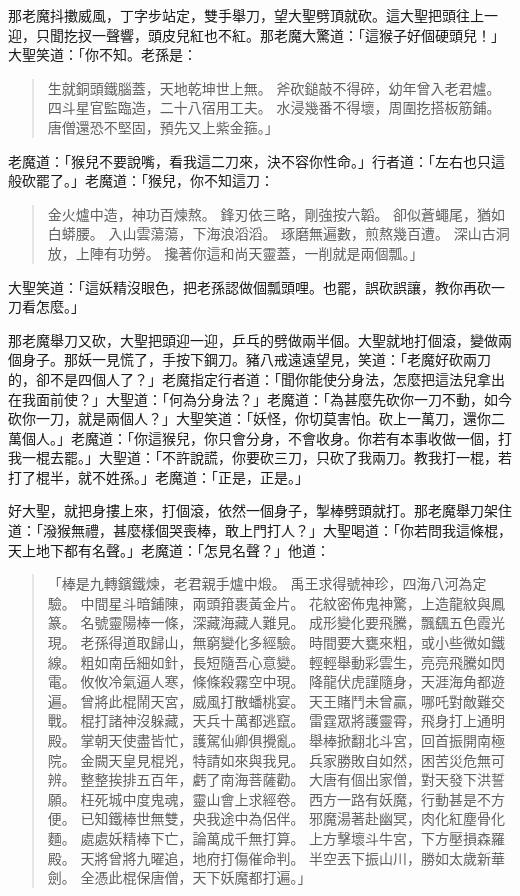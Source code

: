 那老魔抖擻威風，丁字步站定，雙手舉刀，望大聖劈頂就砍。這大聖把頭往上一迎，只聞扢扠一聲響，頭皮兒紅也不紅。那老魔大驚道：「這猴子好個硬頭兒！」大聖笑道：「你不知。老孫是：
\begin{quote}
生就銅頭鐵腦蓋，天地乾坤世上無。
斧砍鎚敲不得碎，幼年曾入老君爐。
四斗星官監臨造，二十八宿用工夫。
水浸幾番不得壞，周圍扢搭板筋鋪。
唐僧還恐不堅固，預先又上紫金箍。」
\end{quote}

老魔道：「猴兒不要說嘴，看我這二刀來，決不容你性命。」行者道：「左右也只這般砍罷了。」老魔道：「猴兒，你不知這刀：
\begin{quote}
金火爐中造，神功百煉熬。
鋒刃依三略，剛強按六韜。
卻似蒼蠅尾，猶如白蟒腰。
入山雲蕩蕩，下海浪滔滔。
琢磨無遍數，煎熬幾百遭。
深山古洞放，上陣有功勞。
攙著你這和尚天靈蓋，一削就是兩個瓢。」
\end{quote}

大聖笑道：「這妖精沒眼色，把老孫認做個瓢頭哩。也罷，誤砍誤讓，教你再砍一刀看怎麼。」

那老魔舉刀又砍，大聖把頭迎一迎，乒乓的劈做兩半個。大聖就地打個滾，變做兩個身子。那妖一見慌了，手按下鋼刀。豬八戒遠遠望見，笑道：「老魔好砍兩刀的，卻不是四個人了？」老魔指定行者道：「聞你能使分身法，怎麼把這法兒拿出在我面前使？」大聖道：「何為分身法？」老魔道：「為甚麼先砍你一刀不動，如今砍你一刀，就是兩個人？」大聖笑道：「妖怪，你切莫害怕。砍上一萬刀，還你二萬個人。」老魔道：「你這猴兒，你只會分身，不會收身。你若有本事收做一個，打我一棍去罷。」大聖道：「不許說謊，你要砍三刀，只砍了我兩刀。教我打一棍，若打了棍半，就不姓孫。」老魔道：「正是，正是。」

好大聖，就把身摟上來，打個滾，依然一個身子，掣棒劈頭就打。那老魔舉刀架住道：「潑猴無禮，甚麼樣個哭喪棒，敢上門打人？」大聖喝道：「你若問我這條棍，天上地下都有名聲。」老魔道：「怎見名聲？」他道：
\begin{quote}
「棒是九轉鑌鐵煉，老君親手爐中煅。
禹王求得號神珍，四海八河為定驗。
中間星斗暗鋪陳，兩頭箝裹黃金片。
花紋密佈鬼神驚，上造龍紋與鳳篆。
名號靈陽棒一條，深藏海藏人難見。
成形變化要飛騰，飄颻五色霞光現。
老孫得道取歸山，無窮變化多經驗。
時間要大甕來粗，或小些微如鐵線。
粗如南岳細如針，長短隨吾心意變。
輕輕舉動彩雲生，亮亮飛騰如閃電。
攸攸冷氣逼人寒，條條殺霧空中現。
降龍伏虎謹隨身，天涯海角都遊遍。
曾將此棍鬧天宮，威風打散蟠桃宴。
天王賭鬥未曾贏，哪吒對敵難交戰。
棍打諸神沒躲藏，天兵十萬都逃竄。
雷霆眾將護靈霄，飛身打上通明殿。
掌朝天使盡皆忙，護駕仙卿俱攪亂。
舉棒掀翻北斗宮，回首振開南極院。
金闕天皇見棍兇，特請如來與我見。
兵家勝敗自如然，困苦災危無可辨。
整整挨排五百年，虧了南海菩薩勸。
大唐有個出家僧，對天發下洪誓願。
枉死城中度鬼魂，靈山會上求經卷。
西方一路有妖魔，行動甚是不方便。
已知鐵棒世無雙，央我途中為侶伴。
邪魔湯著赴幽冥，肉化紅塵骨化麵。
處處妖精棒下亡，論萬成千無打算。
上方擊壞斗牛宮，下方壓損森羅殿。
天將曾將九曜追，地府打傷催命判。
半空丟下振山川，勝如太歲新華劍。
全憑此棍保唐僧，天下妖魔都打遍。」
\end{quote}

